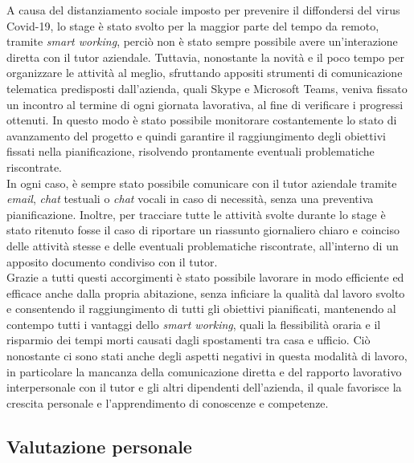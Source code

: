 A causa del distanziamento sociale imposto per prevenire il diffondersi del virus Covid-19, lo stage è stato svolto per la maggior parte del tempo da remoto, tramite \textit{smart working}, perciò non è stato sempre possibile avere un'interazione diretta con il tutor aziendale. Tuttavia, nonostante la novità e il poco tempo per organizzare le attività al meglio, sfruttando appositi strumenti di comunicazione telematica predisposti dall'azienda, quali Skype e Microsoft Teams, veniva fissato un incontro al termine di ogni giornata lavorativa, al fine di verificare i progressi ottenuti. In questo modo è stato possibile monitorare costantemente lo stato di avanzamento del progetto e quindi garantire il raggiungimento degli obiettivi fissati nella pianificazione, risolvendo prontamente eventuali problematiche riscontrate.\\
In ogni caso, è sempre stato possibile comunicare con il tutor aziendale tramite \textit{email}, \textit{chat} testuali o \textit{chat} vocali in caso di necessità, senza una preventiva pianificazione. Inoltre, per tracciare tutte le attività svolte durante lo stage è stato ritenuto fosse il caso di riportare un riassunto giornaliero chiaro e coinciso delle attività stesse e delle eventuali problematiche riscontrate, all’interno di un apposito documento condiviso con il tutor.\\
Grazie a tutti questi accorgimenti è stato possibile lavorare in modo efficiente ed efficace anche dalla propria abitazione, senza inficiare la qualità dal lavoro svolto e consentendo il raggiungimento di tutti gli obiettivi pianificati, mantenendo al contempo tutti i vantaggi dello \textit{smart working}, quali la flessibilità oraria e il risparmio dei tempi morti causati dagli spostamenti tra casa e ufficio. Ciò nonostante ci sono stati anche degli aspetti negativi in questa modalità di lavoro, in particolare la mancanza della comunicazione diretta e del rapporto lavorativo interpersonale con il tutor e gli altri dipendenti dell'azienda, il quale favorisce la crescita personale e l'apprendimento di conoscenze e competenze.

\subsection{Valutazione personale}


